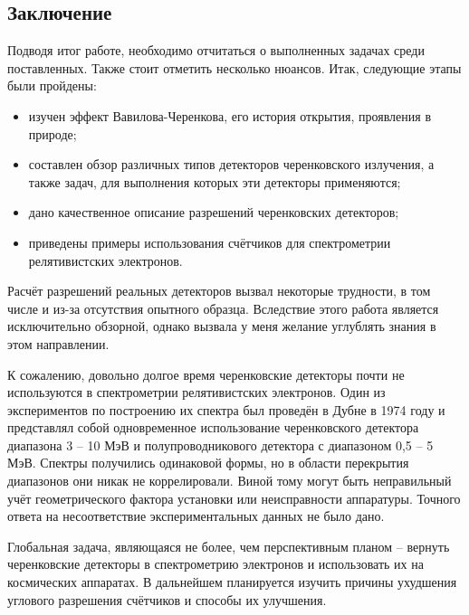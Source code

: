\begin{Diplom-Finish}
	\fontsize{16}{14pt}\selectfont
	\newpage
	
	\part{Заключение}
	\label{sec:part}
	Подводя итог работе, необходимо отчитаться о выполненных задачах среди поставленных. Также стоит отметить несколько нюансов. Итак, следующие этапы были пройдены:
	\begin{itemize}
		\item изучен эффект Вавилова-Черенкова, его история открытия, проявления в природе;
		\item составлен обзор различных типов детекторов черенковского излучения, а также задач, для выполнения которых эти детекторы применяются;
		\item дано качественное описание разрешений черенковских детекторов;
		\item приведены примеры использования счётчиков для спектрометрии релятивистских электронов.
	\end{itemize}
	
	Расчёт разрешений реальных детекторов вызвал некоторые трудности, в том числе и из-за отсутствия опытного образца. Вследствие этого работа является исключительно обзорной, однако вызвала у меня желание углублять знания в этом направлении.
	
	К сожалению, довольно долгое время черенковские детекторы почти не используются в спектрометрии релятивистских электронов. 
	Один из экспериментов по построению их спектра был проведён в Дубне в 1974 году и представлял собой одновременное использование черенковского детектора диапазона 3 -- 10 МэВ и полупроводникового детектора с диапазоном 0,5 -- 5 МэВ. Спектры получились одинаковой формы, но в области перекрытия диапазонов они никак не коррелировали. Виной тому могут быть неправильный учёт геометрического фактора установки или неисправности аппаратуры. Точного ответа на несоответствие экспериментальных данных не было дано. 
	
	 Глобальная задача, являющаяся не более, чем перспективным планом -- вернуть черенковские детекторы в спектрометрию электронов и использовать их на космических аппаратах.
	 В дальнейшем планируется изучить причины ухудшения углового разрешения счётчиков и способы их улучшения.
\end{Diplom-Finish}